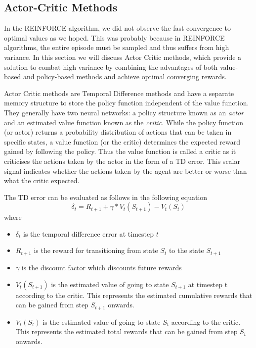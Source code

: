 \documentclass{article}
\begin{document}
\subsection{Actor-Critic Methods}
\par In the REINFORCE algorithm, we did not observe the fast convergence to optimal values as we hoped. This was probably because in REINFORCE algorithms, the entire episode must be sampled and thus suffers from high variance. In this section we will discuss Actor Critic methods, which provide a solution to combat high variance by combining the advantages of both value-based and policy-based methods and achieve optimal converging rewards. 
\par Actor Critic methods are Temporal Difference methods and have a separate memory structure to store the policy function independent of the value function. They generally have two neural networks: a policy structure known as an \emph{actor} and an estimated value function known as the \emph{critic}. While the policy function (or actor) returns a probability distribution of actions that can be taken in specific states, a value function (or the critic) determines the expected reward gained by following the policy. Thus the value function is called a critic as it criticises the actions taken by the actor in the form of a TD error. This scalar signal indicates whether the actions taken by the agent are better or worse than what the critic expected. 
\par The TD error can be evaluated as follows in the following equation
\begin{equation*}
\delta_{t} = R_{t+1} + \gamma * V_t(S_{t+1})-V_t(S_t)
\end{equation*}
 where 
\begin{itemize}[itemsep=0.0pt]
\renewcommand\labelitemi{.}
\item $\delta_{t}$ is the temporal difference error at timestep $t$
\item $R_{t+1}$ is the reward for transitioning from state $S_t$ to the state $S_{t+1}$
\item $\gamma$ is the discount factor which discounts future rewards
\item $V_t(S_{t+1})$ is the estimated value of going to state $S_{t+1}$ at timestep t according to the critic. This represents the estimated cumulative rewards that can be gained from step $S_{t+1}$ onwards.
\item $V_t(S_t)$ is the estimated value of going to state $S_t$ according to the critic. This represents the estimated total rewards that can be gained from step $S_{t}$ onwards.
\end{itemize}
\end{document}
